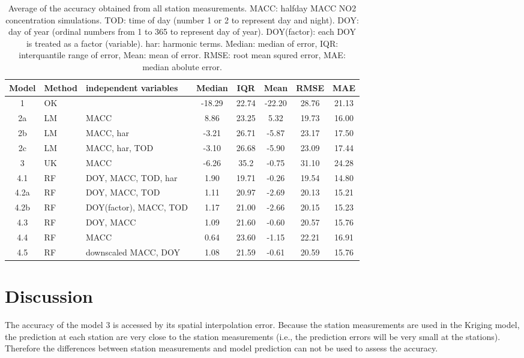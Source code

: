 \documentclass{article}
\begin{document}
\begin{table}[tbp]
\centering
\begin{tabular}{ c l l c c c c c}
  \toprule
 Model &Method& independent variables& Median & IQR& Mean &  RMSE& MAE \\
 \midrule
 1     &OK & \-                 & -18.29 &	22.74&	-22.20 &	28.76 &	21.13\\
 2a    &LM & MACC                  & 8.86 & 23.25     & 5.32 & 19.73 & 16.00 \\
 2b   & LM & MACC, har    &-3.21        & 26.71     & -5.87& 23.17 & 17.50  \\
 2c    &LM & MACC, har, TOD   & -3.10  & 26.68   & -5.90 & 23.09 & 17.44\\ 
 3      &UK & MACC             & -6.26 & 35.2 & -0.75 & 31.10 & 24.28\\
 4.1   &RF & DOY, MACC, TOD, har &  1.90 & 19.71 &-0.26 &19.54& 14.80 \\
 4.2a  &RF & DOY, MACC, TOD                     & 1.11&	20.97	& -2.69 &	20.13 &	15.21 \\
 4.2b  &RF & DOY(factor), MACC, TOD  & 1.17&	21.00	& -2.66 &	20.15	& 15.23 \\
 4.3   &RF & DOY, MACC              &1.09 &	21.60	& -0.60  &	20.57	& 15.76 \\
 4.4   &RF & MACC                   &0.64 &	23.60	& -1.15 &	22.21	& 16.91 \\
4.5 &RF &downscaled MACC, DOY &1.08 &21.59  &-0.61 &20.59& 15.76 \\
\bottomrule
\end{tabular}
\caption{Average of the accuracy obtained from all station measurements. MACC: halfday MACC NO2 concentration simulations. TOD: time of day (number 1 or 2 to represent day and night).
DOY: day of year (ordinal numbers from 1 to 365 to represent day of year). DOY(factor): each DOY is treated as a factor (variable). har: harmonic terms. Median: median of error, IQR: interquantile range of error, Mean: mean of error. RMSE: root mean squred error, MAE: median abolute error.
 } 
\label{table:result}
\end{table} 
 
 
\section{Discussion}

The accuracy of the model 3 is accessed by its spatial interpolation error. Because the station measurements are used in the Kriging model, the prediction at
each station are very close to the station measurements (i.e., the
prediction errors will be very small at the stations). Therefore the differences between station measurements and model prediction can not be used to assess the accuracy.  
\end{document}
